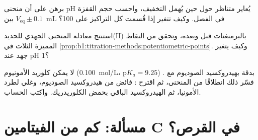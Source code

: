 \begin{exercise}[$\star\star\star$]\label{exo:b1:titration-methods:10}
برهن على أن منحنى pH  يُعاير 
متناظر حول  حين يُهمل التخفيف،
واحسب حجم القفزة بين $V_{\mathrm{eq}} \pm 0.1$~mL
في  الفصل. وكيف تتغير إذا قُسمت كل
التراكيز على 100؟
\end{exercise}

\begin{exercise}[$\star\star\star$]\label{exo:b1:titration-methods:11}
استنتج معادلة المنحنى الجهدي للحديد(II) بالبرمنغنات
قبل  وبعده، وتحقق من النقاط المميزة الثلاث
في \cref{prop:b1:titration-methods:potentiometric-points}.
وكيف يتغير جهد  عند pH 1؟
\end{exercise}

\begin{exercise}[$\star\star\star$]\label{exo:b1:titration-methods:12}
لا يمكن  كلوريد الأمونيوم (\qty{0.100}{mol/L}، $\mathrm{p}K_a = 9.25$)
بدقة بهيدروكسيد الصوديوم مع . فسّر ذلك انطلاقًا من
المنحنى، ثم اقترح : فائض من هيدروكسيد الصوديوم، وغلي
لطرد الأمونيا، ثم  الهيدروكسيد الباقي بحمض الكلوريدريك.
واكتب الحساب.
\end{exercise}

\section{مسألة: كم من الفيتامين C في القرص؟}

